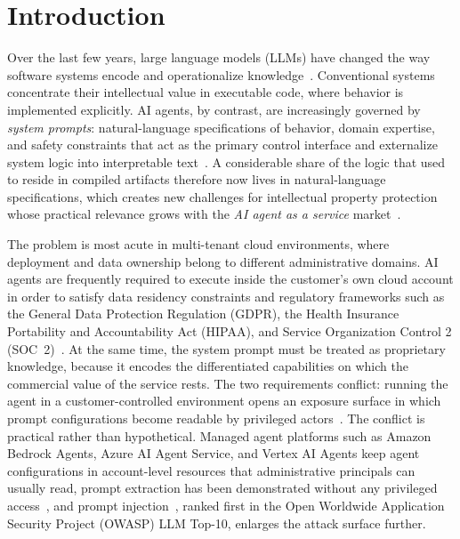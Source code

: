 \section{Introduction}
\label{sec:intro}

Over the last few years, large language models (LLMs) have changed the way software systems encode and operationalize knowledge~\cite{brown2020gpt3,bommasani2021foundation}. Conventional systems concentrate their intellectual value in executable code, where behavior is implemented explicitly. AI agents, by contrast, are increasingly governed by \emph{system prompts}: natural-language specifications of behavior, domain expertise, and safety constraints that act as the primary control interface and externalize system logic into interpretable text~\cite{yao2023react,schick2023toolformer,wang2024llmagents}. A considerable share of the logic that used to reside in compiled artifacts therefore now lives in natural-language specifications, which creates new challenges for intellectual property protection whose practical relevance grows with the \emph{AI agent as a service} market~\cite{marketsandmarkets2024}.

The problem is most acute in multi-tenant cloud environments, where deployment and data ownership belong to different administrative domains. AI agents are frequently required to execute inside the customer's own cloud account in order to satisfy data residency constraints and regulatory frameworks such as the General Data Protection Regulation (GDPR), the Health Insurance Portability and Accountability Act (HIPAA), and Service Organization Control 2 (SOC~2)~\cite{gdpr2016}. At the same time, the system prompt must be treated as proprietary knowledge, because it encodes the differentiated capabilities on which the commercial value of the service rests. The two requirements conflict: running the agent in a customer-controlled environment opens an exposure surface in which prompt configurations become readable by privileged actors~\cite{aws_shared_responsibility,agenticsecurity2025}. The conflict is practical rather than hypothetical. Managed agent platforms such as Amazon Bedrock Agents, Azure AI Agent Service, and Vertex AI Agents keep agent configurations in account-level resources that administrative principals can usually read, prompt extraction has been demonstrated without any privileged access~\cite{hui2024pleak,multiturn2024}, and prompt injection~\cite{promptinjection2026,owasp2025}, ranked first in the Open Worldwide Application Security Project (OWASP) LLM Top-10, enlarges the attack surface further.

